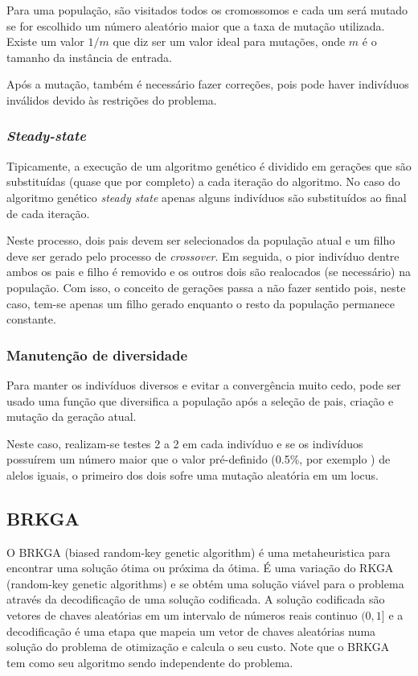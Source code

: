 \documentclass[conference]{IEEEtran}
\begin{document}
         Para uma população, são visitados todos os cromossomos e cada um será mutado se for escolhido um número aleatório maior que a taxa de mutação utilizada. Existe um valor $1/m$
         \cite{gendreau2010handbook} que diz ser um valor ideal para mutações, onde $m$ é o tamanho da instância de entrada.
         
        Após a mutação, também é necessário fazer correções, pois pode haver indivíduos inválidos devido às restrições do problema.


    \subsubsection{\emph{Steady-state}}

        Tipicamente, a execução de um algoritmo genético é dividido em gerações que são substituídas (quase que por completo) a cada iteração do algoritmo. No caso do algoritmo genético
        \emph{steady state} apenas alguns indivíduos são substituídos ao final de cada iteração.

        Neste processo, dois pais devem ser selecionados da população atual e um filho deve ser gerado pelo processo de \emph{crossover}. Em seguida, o pior indivíduo dentre ambos os pais e filho é
        removido e os outros dois são realocados (se necessário) na população. Com isso, o conceito de gerações passa a não fazer sentido pois, neste caso, tem-se apenas um filho gerado enquanto o
        resto da população permanece constante.  

    \subsubsection{Manutenção de diversidade}

        Para manter os indivíduos diversos e evitar a convergência muito cedo, pode ser usado uma função que diversifica a população após a seleção de pais, criação e mutação da geração atual.

        Neste caso, realizam-se testes 2 a 2 em cada indivíduo e se os indivíduos possuírem um número maior que o valor pré-definido (0.5$\%$, por exemplo ) de alelos iguais, o primeiro dos
        dois sofre uma mutação aleatória em um locus.


\subsection{BRKGA}
\label{sec:alg_genetic}

    O BRKGA (biased random-key genetic algorithm)\cite{gonccalves2011biased} é uma metaheuristica para encontrar uma solução ótima ou próxima da ótima. É uma variação do RKGA
    (random-key genetic algorithms) \cite{bean1994genetic} e se obtém uma solução viável para o problema através da decodificação de uma solução codificada. A solução codificada são vetores de
    chaves aleatórias em um intervalo de números reais continuo $(0,1]$ e a decodificação é uma etapa que mapeia um vetor de chaves aleatórias numa solução do problema de otimização e calcula o
    seu custo. Note que o BRKGA tem como seu algoritmo sendo independente do problema. 
\end{document}
